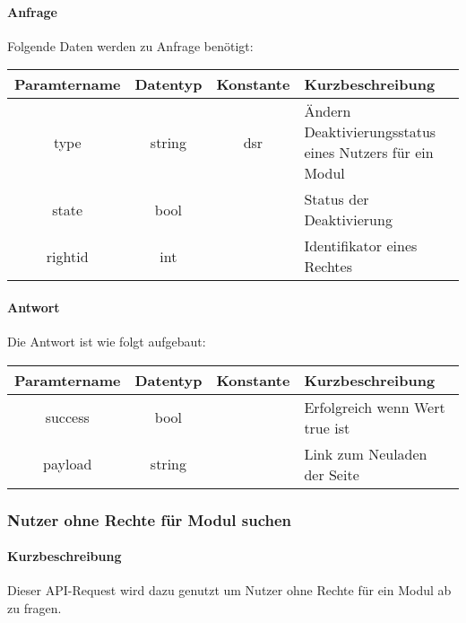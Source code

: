 \paragraph{Anfrage}Folgende Daten werden zu Anfrage benötigt:
\begin{table}[H]
	\begin{tabular}{|c|c|c|p{6.5cm}|}
		\hline
		\textbf{Paramtername} & \textbf{Datentyp} & \textbf{Konstante} & \textbf{Kurzbeschreibung}                                                                                               \\ \hline
		type                & string            & dsr                & Ändern Deaktivierungsstatus eines Nutzers für ein Modul \\ \hline
		state               & bool              &                    & Status der Deaktivierung \\ \hline
		rightid             & int               &                    & Identifikator eines Rechtes \\ \hline
	\end{tabular}
\end{table}
\paragraph{Antwort}Die Antwort ist wie folgt aufgebaut:
\begin{table}[H]
	\begin{tabular}{|c|c|c|p{6.5cm}|}
		\hline
		\textbf{Paramtername} & \textbf{Datentyp} & \textbf{Konstante} & \textbf{Kurzbeschreibung}            \\ \hline                
		success             & bool             &                 & Erfolgreich wenn Wert {\glqq true\grqq} ist \\ \hline
		payload             & string           &                 & Link zum Neuladen der Seite \\ \hline
	\end{tabular}
\end{table}
\subsubsection{Nutzer ohne Rechte für Modul suchen}
\paragraph{Kurzbeschreibung}Dieser API-Request wird dazu genutzt um Nutzer ohne Rechte für ein Modul ab zu fragen.
